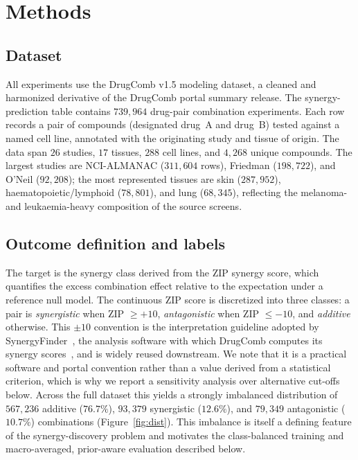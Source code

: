 \documentclass[11pt]{article}
\begin{document}
\section{Methods}

\subsection{Dataset}
All experiments use the DrugComb v1.5 modeling dataset, a cleaned and harmonized derivative of the
DrugComb portal summary release. The synergy-prediction table contains $739{,}964$ drug-pair
combination experiments. Each row records a pair of compounds (designated drug~A and drug~B) tested
against a named cell line, annotated with the originating study and tissue of origin. The data span
$26$ studies, $17$ tissues, $288$ cell lines, and $4{,}268$ unique compounds. The largest studies are
NCI-ALMANAC ($311{,}604$ rows), Friedman ($198{,}722$), and O'Neil ($92{,}208$); the most represented
tissues are skin ($287{,}952$), haematopoietic/lymphoid ($78{,}801$), and lung ($68{,}345$),
reflecting the melanoma- and leukaemia-heavy composition of the source screens.

\subsection{Outcome definition and labels}
The target is the synergy class derived from the ZIP synergy score, which quantifies the excess
combination effect relative to the expectation under a reference null model. The continuous ZIP score is discretized into three classes: a
pair is \emph{synergistic} when ZIP $\geq +10$, \emph{antagonistic} when ZIP $\leq -10$, and
\emph{additive} otherwise. This $\pm 10$ convention is the interpretation guideline adopted by
SynergyFinder~\cite{ianevski2020}, the analysis software with which DrugComb computes its synergy
scores~\cite{zheng2021}, and is widely reused downstream. We note that it is a practical
software and portal convention rather than a value derived from a statistical criterion, which is why
we report a sensitivity analysis over alternative cut-offs below. Across the full dataset this yields a strongly imbalanced distribution of
$567{,}236$ additive ($76.7\%$), $93{,}379$ synergistic ($12.6\%$), and $79{,}349$ antagonistic
($10.7\%$) combinations (Figure~\ref{fig:dist}). This imbalance is itself a defining feature of the
synergy-discovery problem and motivates the class-balanced training and macro-averaged, prior-aware
evaluation described below.
\end{document}
